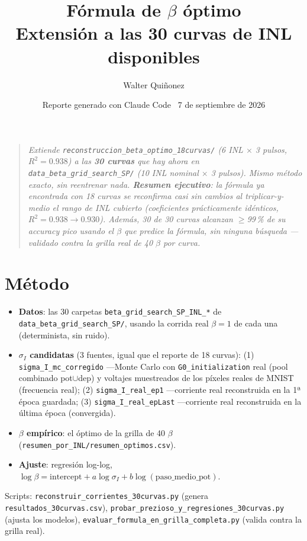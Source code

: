 \documentclass[11pt]{article}
\title{\textbf{Fórmula de $\beta$ óptimo\\
Extensión a las 30 curvas de INL disponibles}}
\author{Walter Quiñonez}
\date{Reporte generado con Claude Code \textperiodcentered\ 7 de septiembre de 2026}
\begin{document}
\maketitle

\begin{quote}\itshape
Extiende \texttt{reconstruccion\_beta\_optimo\_18curvas/} (6 INL $\times$ 3
pulsos, $R^2=0.938$) a las \textbf{30 curvas} que hay ahora en
\texttt{data\_beta\_grid\_search\_SP/} (10 INL nominal $\times$ 3 pulsos).
Mismo método exacto, sin reentrenar nada. \textbf{Resumen ejecutivo}: la
fórmula ya encontrada con 18 curvas se reconfirma casi sin cambios al
triplicar-y-medio el rango de INL cubierto (coeficientes prácticamente
idénticos, $R^2=0.938\to0.930$). Además, 30 de 30 curvas alcanzan
$\geq$99\,\% de su accuracy pico usando el $\beta$ que predice la fórmula,
sin ninguna búsqueda —validado contra la grilla real de 40 $\beta$ por
curva.
\end{quote}

\tableofcontents

\section{Método}

\begin{itemize}
\item \textbf{Datos}: las 30 carpetas \texttt{beta\_grid\_search\_SP\_INL\_*}
  de \texttt{data\_beta\_grid\_search\_SP/}, usando la corrida real
  $\beta=1$ de cada una (determinista, sin ruido).
\item \textbf{$\sigma_I$ candidatas} (3 fuentes, igual que el reporte de
  18 curvas): (1) \texttt{sigma\_I\_mc\_corregido} —Monte Carlo con
  \texttt{G0\_initialization} real (pool combinado pot$\cup$dep) y voltajes
  muestreados de los píxeles reales de MNIST (frecuencia real); (2)
  \texttt{sigma\_I\_real\_ep1} —corriente real reconstruida en la 1ª época
  guardada; (3) \texttt{sigma\_I\_real\_epLast} —corriente real
  reconstruida en la última época (convergida).
\item \textbf{$\beta$ empírico}: el óptimo de la grilla de 40 $\beta$
  (\texttt{resumen\_por\_INL/resumen\_optimos.csv}).
\item \textbf{Ajuste}: regresión log-log, $\log\beta = \text{intercept} +
  a\log\sigma_I + b\log(\text{paso\_medio\_pot})$.
\end{itemize}

Scripts: \texttt{reconstruir\_corrientes\_30curvas.py} (genera
\texttt{resultados\_30curvas.csv}), \texttt{probar\_prezioso\_y\_regresiones\_30curvas.py}
(ajusta los modelos), \texttt{evaluar\_formula\_en\_grilla\_completa.py}
(valida contra la grilla real).
\end{document}
